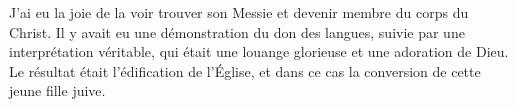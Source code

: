 J'ai eu la joie de la voir trouver son Messie et devenir membre du corps
 du Christ. Il y avait eu une démonstration du don des langues,
 suivie par une interprétation véritable, qui était une louange glorieuse
 et une adoration de Dieu. Le résultat était l'édification de l'Église,
 et dans ce cas la conversion de cette jeune fille juive.
\closechapter

